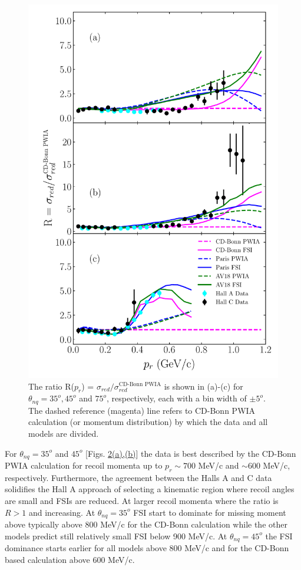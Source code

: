 \begin{figure}[h!]
\includegraphics[scale=0.5]{./prl_plots/PRL_plot2.pdf}
\caption{The ratio R($p_{r}$) = $\sigma_{red}/\sigma^{{\text{CD-Bonn PWIA}}}_{red}$ is shown in (a)-(c) for $\theta_{nq}=35^{o}, 45^{o}$ and $75^{o}$, respectively, each with a bin width of $\pm 5^{o}$.
The dashed reference (magenta) line refers to CD-Bonn PWIA calculation (or momentum distribution) by which the data and all models are divided.}
\label{fig:fig2}
\end{figure}

For $\theta_{nq}=35^{o}$ and $45^{o}$ [Figs. \hyperref[fig:fig2]{2(a),(b)}] the data is best described by the CD-Bonn PWIA calculation for recoil momenta up to $p_{r}\sim700$ MeV/c and $\sim600$ MeV/c, respectively.
Furthermore, the agreement between the Halls A and C data solidifies the Hall A approach of selecting a kinematic region where recoil angles are small and FSIs are reduced.
At larger recoil momenta where the ratio is $R>1$ and increasing.  At $\theta_{nq}=35^{o}$ FSI start to dominate for missing moment above typically above 800 MeV/c for the CD-Bonn calculation while the other models predict still relatively small FSI below 900 MeV/c. At $\theta_{nq}=45^{o}$ the FSI dominance starts earlier for all models above 800 MeV/c and for the CD-Bonn based calculation above 600 MeV/c. 

